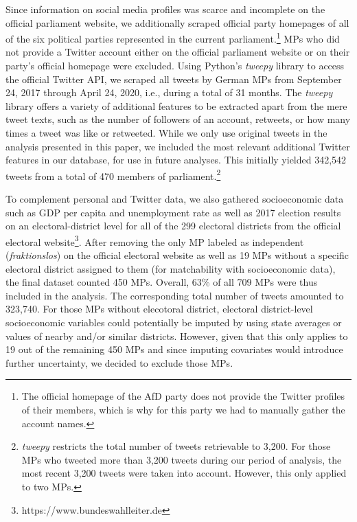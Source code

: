 Since information on social media profiles was scarce and incomplete on the official parliament website, we additionally scraped official party homepages of all of the six political parties represented in the current parliament.\footnote{The official homepage of the AfD party does not provide the Twitter profiles of their members, which is why for this party we had to manually gather the account names.} MPs who did not provide a Twitter account either on the official parliament website or on their party's official homepage were excluded. Using Python's \textit{tweepy} library to access the official Twitter API, we scraped all tweets by German MPs from September 24, 2017 through April 24, 2020, i.e., during a total of 31 months. The \textit{tweepy} library offers a variety of additional features to be extracted apart from the mere tweet texts, such as the number of followers of an account, retweets, or how many times a tweet was like or retweeted. While we only use original tweets in the analysis presented in this paper, we included the most relevant additional Twitter features in our database, for use in future analyses. This initially yielded 342,542 tweets from a total of 470 members of parliament.\footnote{\textit{tweepy} restricts the total number of tweets retrievable to 3,200. For those MPs who tweeted more than 3,200 tweets during our period of analysis, the most recent 3,200 tweets were taken into account. However, this only applied to two MPs.}

To complement personal and Twitter data, we also gathered socioeconomic data such as GDP per capita and unemployment rate as well as 2017 election results on an electoral-district level for all of the 299 electoral districts from the official electoral website\footnote{https://www.bundeswahlleiter.de}. After removing the only MP labeled as independent (\textit{fraktionslos}) on the official electoral website as well as 19 MPs without a specific electoral district assigned to them (for matchability with socioeconomic data), the final dataset counted 450 MPs. Overall, 63\% of all 709 MPs were thus included in the analysis. The corresponding total number of tweets amounted to 323,740. For those MPs without elecotoral district, electoral district-level socioeconomic variables could potentially be imputed by using state averages or values of nearby and/or similar districts. However, given that this only applies to 19 out of the remaining 450 MPs and since imputing covariates would introduce further uncertainty, we decided to exclude those MPs.


